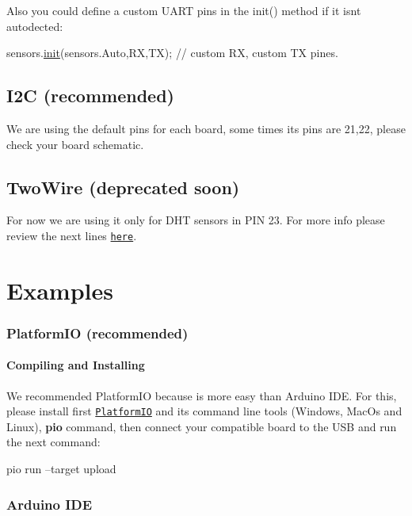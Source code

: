 Also you could define a custom U\+A\+RT pins in the init() method if it isn\textquotesingle{}t autodected\+:


\begin{DoxyCode}
sensors.\hyperlink{classSensors_a019efdf3e65081e9ace94e1f05338e4b}{init}(sensors.Auto,RX,TX); \textcolor{comment}{// custom RX, custom TX pines.}
\end{DoxyCode}


\subsection*{I2C (recommended)}

We are using the default pins for each board, some times it\textquotesingle{}s pins are 21,22, please check your board schematic.

\subsection*{Two\+Wire (deprecated soon)}

For now we are using it only for D\+HT sensors in P\+IN 23. For more info please review the next lines \href{https://github.com/kike-canaries/canairio_sensorlib/blob/master/src/Sensors.hpp#L19-L52}{\tt here}.

\section*{Examples}

\subsubsection*{Platform\+IO (recommended)}

\paragraph*{Compiling and Installing}

We recommended Platform\+IO because is more easy than Arduino I\+DE. For this, please install first \href{http://platformio.org/}{\tt Platform\+IO} and its command line tools (Windows, Mac\+Os and Linux), {\bfseries pio} command, then connect your compatible board to the U\+SB and run the next command\+:


\begin{DoxyCode}
pio run --target upload
\end{DoxyCode}


\subsubsection*{Arduino I\+DE}


